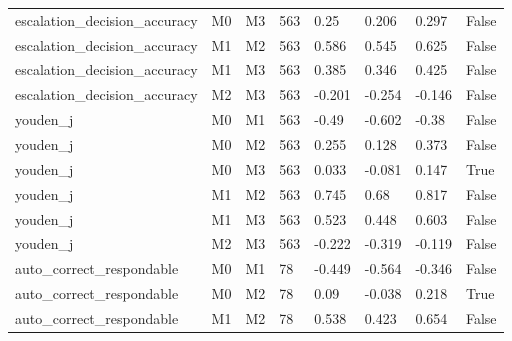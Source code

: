 \begin{table}[!t]
{\begin{tabular}{llllllll}
escalation\_decision\_accuracy & M0 & M3 & 563 & 0.25 & 0.206 & 0.297 & False \\
escalation\_decision\_accuracy & M1 & M2 & 563 & 0.586 & 0.545 & 0.625 & False \\
escalation\_decision\_accuracy & M1 & M3 & 563 & 0.385 & 0.346 & 0.425 & False \\
escalation\_decision\_accuracy & M2 & M3 & 563 & -0.201 & -0.254 & -0.146 & False \\
youden\_j & M0 & M1 & 563 & -0.49 & -0.602 & -0.38 & False \\
youden\_j & M0 & M2 & 563 & 0.255 & 0.128 & 0.373 & False \\
youden\_j & M0 & M3 & 563 & 0.033 & -0.081 & 0.147 & True \\
youden\_j & M1 & M2 & 563 & 0.745 & 0.68 & 0.817 & False \\
youden\_j & M1 & M3 & 563 & 0.523 & 0.448 & 0.603 & False \\
youden\_j & M2 & M3 & 563 & -0.222 & -0.319 & -0.119 & False \\
auto\_correct\_respondable & M0 & M1 & 78 & -0.449 & -0.564 & -0.346 & False \\
auto\_correct\_respondable & M0 & M2 & 78 & 0.09 & -0.038 & 0.218 & True \\
auto\_correct\_respondable & M1 & M2 & 78 & 0.538 & 0.423 & 0.654 & False \\
\bottomrule
\end{tabular}}
\end{table}

